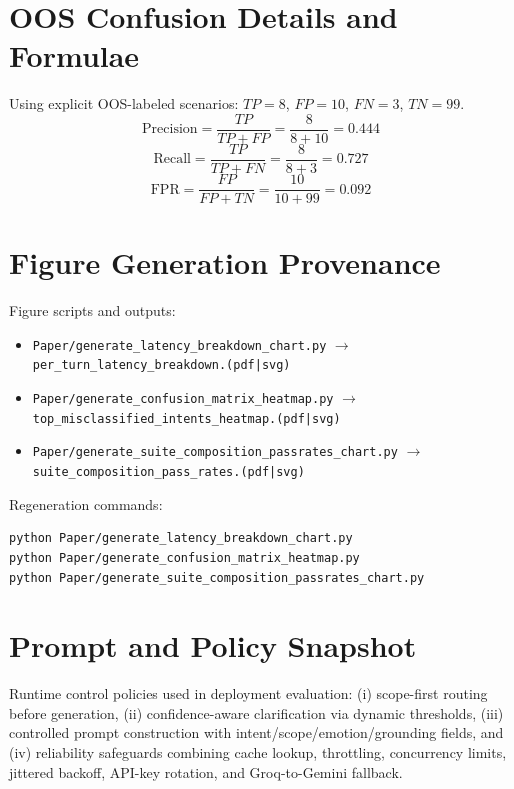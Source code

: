 \documentclass[12pt,onecolumn]{report}
\begin{document}
\section{OOS Confusion Details and Formulae}
Using explicit OOS-labeled scenarios: $TP=8$, $FP=10$, $FN=3$, $TN=99$.
\[
\text{Precision}=\frac{TP}{TP+FP}=\frac{8}{8+10}=0.444
\]
\[
\text{Recall}=\frac{TP}{TP+FN}=\frac{8}{8+3}=0.727
\]
\[
\text{FPR}=\frac{FP}{FP+TN}=\frac{10}{10+99}=0.092
\]

\vspace{0.5em}
\section{Figure Generation Provenance}
Figure scripts and outputs:
\begin{itemize}
\item \texttt{Paper/generate\_latency\_breakdown\_chart.py} $\rightarrow$ \texttt{per\_turn\_latency\_breakdown.(pdf|svg)}
\item \texttt{Paper/generate\_confusion\_matrix\_heatmap.py} $\rightarrow$ \texttt{top\_misclassified\_intents\_heatmap.(pdf|svg)}
\item \texttt{Paper/generate\_suite\_composition\_passrates\_chart.py} $\rightarrow$ \texttt{suite\_composition\_pass\_rates.(pdf|svg)}
\end{itemize}

Regeneration commands:
\begin{verbatim}
python Paper/generate_latency_breakdown_chart.py
python Paper/generate_confusion_matrix_heatmap.py
python Paper/generate_suite_composition_passrates_chart.py
\end{verbatim}

\section{Prompt and Policy Snapshot}
Runtime control policies used in deployment evaluation: (i) scope-first routing before generation, (ii) confidence-aware clarification via dynamic thresholds, (iii) controlled prompt construction with intent/scope/emotion/grounding fields, and (iv) reliability safeguards combining cache lookup, throttling, concurrency limits, jittered backoff, API-key rotation, and Groq-to-Gemini fallback.
\end{document}
